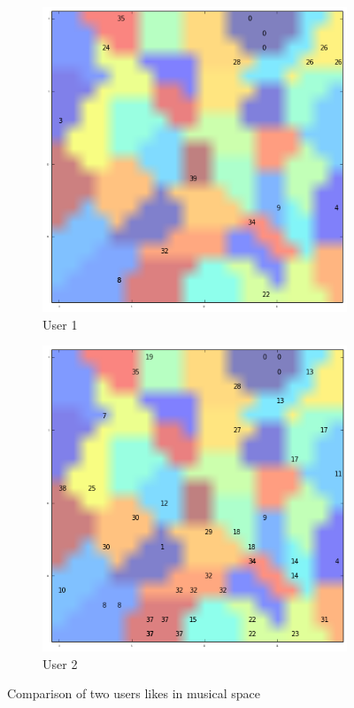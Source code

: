 \documentclass[cic,tc,english]{iiufrgs}
\begin{document}
\begin{figure}
\centering
\begin{subfigure}{.5\textwidth}
  \centering
  \includegraphics[width=\linewidth]{user1}
  \caption{User 1}
  \label{fig:user1}
\end{subfigure}%
\begin{subfigure}{.5\textwidth}
  \centering
  \includegraphics[width=\linewidth]{user2}
  \caption{User 2}
  \label{fig:user2}
\end{subfigure}
\caption{Comparison of two users likes in musical space}
\label{fig:music_space}
\end{figure}
\end{document}
